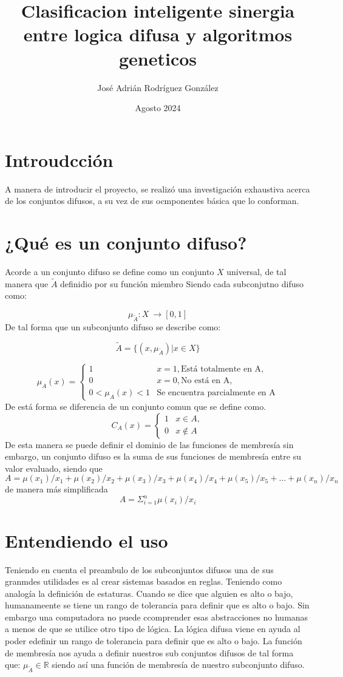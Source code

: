\documentclass{article}
\title{Clasificacion inteligente sinergia entre logica difusa y algoritmos geneticos }
\author{José Adrián Rodríguez González}
\date{Agosto 2024}
\begin{document}
\maketitle
\section{Introudcción}
A manera de introducir el proyecto, se realizó una investigación exhaustiva acerca de los conjuntos difusos, a su vez de sus ocmponentes básica que lo conforman.
\section{¿Qué es un conjunto difuso?}
Acorde a \citep{ZADEH1965338} un conjunto difuso se define como un conjunto $X$ universal, de tal manera que $\tilde{A}$ definidio por su función miembro 
Siendo cada subconjutno difuso como:

\[\mu_{\tilde{A}}: X\ \rightarrow[0,1]\]
De tal forma que un subconjunto difuso se describe como: 

\[
\tilde{A}=\{(x,\mu_{\tilde{A}})| x\in X\}
\]

\[
\mu_A(x) =
\begin{cases}
  1 & x=1,\text{Está totalmente en A},  \\
  0 & x=0, \text{No está en A}, \\
  0<\mu_A(x)<1 & \text{Se encuentra parcialmente en A}
\end{cases}
\]
De está forma se diferencia de un conjunto comun que se define como.
\[
C_A(x) =
\begin{cases}
  1 & x \in A,  \\
  0 & x \notin  A
\end{cases}
\]
De esta manera se puede definir el dominio de las funciones de membresía sin embargo, un conjunto difuso es la suma de sus funciones de membresía entre su valor evaluado, siendo que
$$A = \mu(x_1) /x_1+\mu(x_2) /x_2+\mu(x_3) /x_3+\mu(x_4) /x_4+\mu(x_5) /x_5+\dots +\mu(x_n) /x_n$$
de manera más simplificada
$$A= \Sigma^n_{i=1} \mu(x_i) /x_i$$
\section{Entendiendo el uso}
Teniendo en cuenta el preambulo de los subconjuntos difusos una de sus granmdes utilidades es al crear sistemas basados en reglas.  Teniendo como analogía la definición de estaturas. Cuando se dice que alguien es alto o bajo, humanameente se tiene un rango de tolerancia para definir que es alto o bajo. Sin embargo una computadora no puede ccomprender esas abstracciones no humanas a menos de que se utilice otro tipo de lógica. La lógica difusa viene en ayuda al poder edefinir un rango de tolerancia para definir que es alto o bajo.
La función de membresía nos ayuda a definir nuestros sub conjuntos difusos de tal forma que: 
\(\mu_{\tilde{A}} \in \mathbb{R}\) siendo así una función de membresía de nuestro subconjunto difuso.
\end{document}
